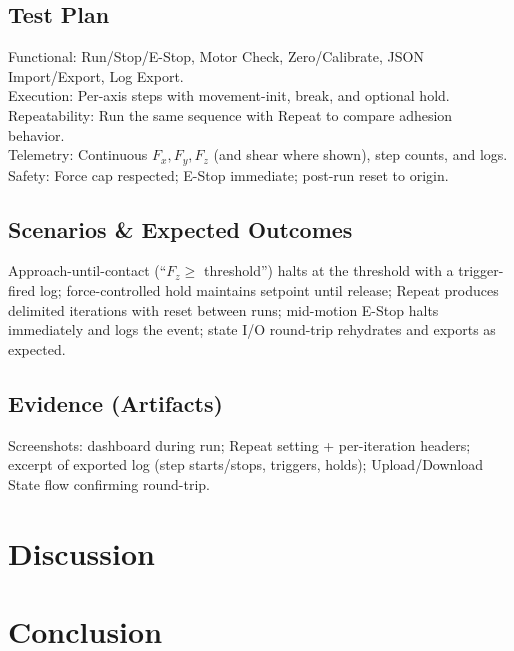 \documentclass[
    twocolumn,
    fontsize = 10pt,
    parskip = half+,
    headings = small,
    headwidth = text,
    footwidth = text,
]{scrartcl}
\begin{document}
\subsection{Test Plan}
Functional: Run/Stop/E-Stop, Motor Check, Zero/Calibrate, JSON Import/Export, Log Export.\\
Execution: Per-axis steps with movement-init, break, and optional hold.\\
Repeatability: Run the same sequence with Repeat to compare adhesion behavior.\\
Telemetry: Continuous $F_x, F_y, F_z$ (and shear where shown), step counts, and logs.\\
Safety: Force cap respected; E-Stop immediate; post-run reset to origin.

\subsection{Scenarios \& Expected Outcomes}
Approach-until-contact (``$F_z \ge$ threshold'') halts at the threshold with a trigger-fired log; 
force-controlled hold maintains setpoint until release; 
Repeat produces delimited iterations with reset between runs; 
mid-motion E-Stop halts immediately and logs the event; 
state I/O round-trip rehydrates and exports as expected.

\subsection{Evidence (Artifacts)}
Screenshots: dashboard during run; Repeat setting + per-iteration headers; excerpt of exported log (step starts/stops, triggers, holds); Upload/Download State flow confirming round-trip.



\section{Discussion}


\section{Conclusion}

\printbibliography

\printglossaries
\appendix
{}

\end{document}
